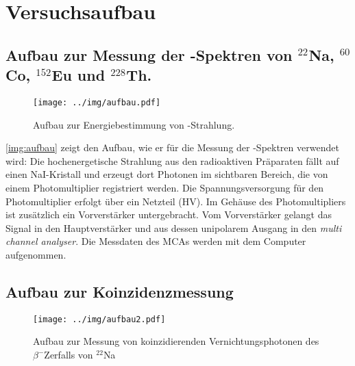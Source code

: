 \section{Versuchsaufbau}

\subsection{Aufbau zur Messung der \textgamma-Spektren von \texorpdfstring{${}^{22}$Na, ${}^{60}$Co, ${}^{152}$Eu und ${}^{228}$Th}{22-Na, 60-Co, 152-Eu und 228-Th}.}

\begin{figure}[H]
\begin{center}
  \texttt{[image: ../img/aufbau.pdf]}
  \caption[---]{Aufbau zur Energiebestimmung von \textgamma-Strahlung.}
  \label{img:aufbau}
\end{center}
\end{figure}

\autoref{img:aufbau} zeigt den Aufbau, wie er für die Messung der \textgamma-Spektren verwendet wird:
Die hochenergetische Strahlung aus den radioaktiven Präparaten fällt auf einen NaI-Kristall und
erzeugt dort Photonen im sichtbaren Bereich, die von einem Photomultiplier registriert werden.
Die Spannungsversorgung für den Photomultiplier erfolgt über ein Netzteil (HV).
Im Gehäuse des Photomultipliers ist zusätzlich ein Vorverstärker untergebracht.
Vom Vorverstärker gelangt das Signal in den Hauptverstärker und aus dessen unipolarem Ausgang
in den \emph{multi channel analyser}.
Die Messdaten des MCAs werden mit dem Computer aufgenommen.


\subsection{Aufbau zur Koinzidenzmessung}

\begin{figure}[H]
\begin{center}
  \texttt{[image: ../img/aufbau2.pdf]}
  \caption[---]{Aufbau zur Messung von koinzidierenden Vernichtungsphotonen
  des $\beta^-$Zerfalls von ${}^{22}$Na}
  \label{img:aufbau2}
\end{center}
\end{figure}


